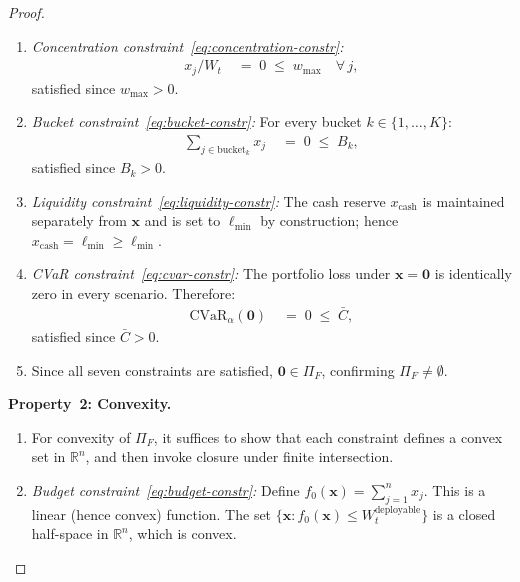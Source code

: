 \documentclass[12pt,openany]{book}
\newcommand{\bfx}{\mathbf{x}}
\numberwithin{equation}{chapter}
\theoremstyle{plain}
\theoremstyle{definition}
\theoremstyle{remark}
\numberwithin{equation}{chapter}
\theoremstyle{plain}
\begin{document}
\begin{proof}
\begin{enumerate}
  \item \textit{Concentration constraint~\eqref{eq:concentration-constr}:}
        \begin{align}
          x_j / W_t &\;=\; 0 \;\leq\; w_{\max} \quad \forall\,j,
        \end{align}
        satisfied since $w_{\max} > 0$.

  \item \textit{Bucket constraint~\eqref{eq:bucket-constr}:}
        For every bucket $k \in \{1,\ldots,K\}$:
        \begin{align}
          \sum_{j \in \mathrm{bucket}_k} x_j
          &\;=\; 0 \;\leq\; B_k,
        \end{align}
        satisfied since $B_k > 0$.

  \item \textit{Liquidity constraint~\eqref{eq:liquidity-constr}:}
        The cash reserve $x_{\mathrm{cash}}$ is maintained separately
        from $\bfx$ and is set to $\ell_{\min}$ by construction; hence
        $x_{\mathrm{cash}} = \ell_{\min} \geq \ell_{\min}$.

  \item \textit{CVaR constraint~\eqref{eq:cvar-constr}:}
        The portfolio loss under $\bfx = \mathbf{0}$ is identically
        zero in every scenario.  Therefore:
        \begin{align}
          \mathrm{CVaR}_\alpha(\mathbf{0})
          &\;=\; 0 \;\leq\; \bar{C},
        \end{align}
        satisfied since $\bar{C} > 0$.

  \item Since all seven constraints are satisfied, $\mathbf{0} \in \Pi_F$,
        confirming $\Pi_F \neq \emptyset$.
\end{enumerate}

\medskip
\noindent\textbf{Property~2: Convexity.}

\begin{enumerate}
  \item For convexity of $\Pi_F$, it suffices to show that each
        constraint defines a convex set in $\mathbb{R}^n$, and then
        invoke closure under finite intersection.

  \item \textit{Budget constraint~\eqref{eq:budget-constr}:}
        Define $f_0(\bfx) = \sum_{j=1}^n x_j$.  This is a linear
        (hence convex) function.  The set
        $\{\bfx : f_0(\bfx) \leq W_t^{\mathrm{deployable}}\}$
        is a closed half-space in $\mathbb{R}^n$, which is convex.


\end{enumerate}
\end{proof}
\end{document}
